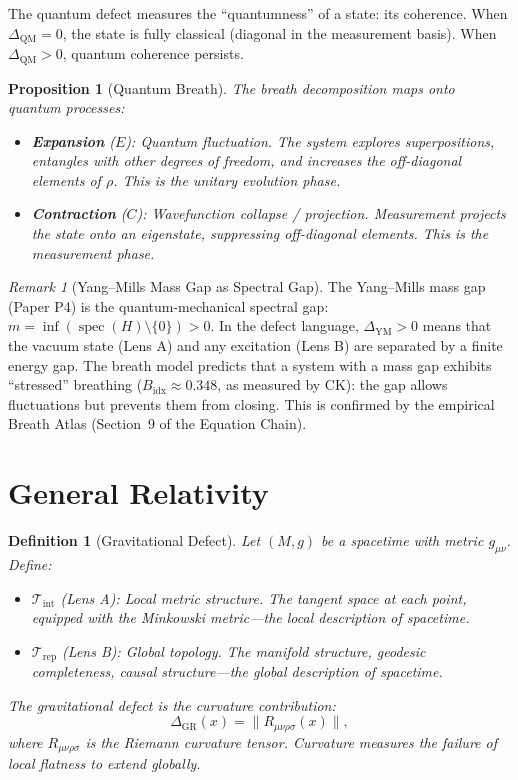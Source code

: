 \documentclass[12pt, openany]{book}
\newtheorem{proposition}[theorem]{Proposition}
\newtheorem{definition}[theorem]{Definition}
\theoremstyle{remark}
\newtheorem{remark}[theorem]{Remark}
\newcommand{\Tint}{\mathcal{T}_{\mathrm{int}}}
\newcommand{\Trep}{\mathcal{T}_{\mathrm{rep}}}
\DeclareMathOperator{\spec}{spec}
\begin{document}
\noindent
The quantum defect measures the ``quantumness'' of a state: its coherence.
When $\Delta_{\mathrm{QM}} = 0$, the state is fully classical (diagonal in the
measurement basis).  When $\Delta_{\mathrm{QM}} > 0$, quantum coherence persists.

\begin{proposition}[Quantum Breath]
\label{prop:quantum-breath}
The breath decomposition maps onto quantum processes:
\begin{itemize}
  \item \textbf{Expansion} ($E$): Quantum fluctuation.  The system explores
        superpositions, entangles with other degrees of freedom, and increases
        the off-diagonal elements of $\rho$.  This is the unitary evolution
        phase.
  \item \textbf{Contraction} ($C$): Wavefunction collapse / projection.
        Measurement projects the state onto an eigenstate, suppressing
        off-diagonal elements.  This is the measurement phase.
\end{itemize}
\end{proposition}

\begin{remark}[Yang--Mills Mass Gap as Spectral Gap]
The Yang--Mills mass gap (Paper P4) is the quantum-mechanical spectral gap:
$m = \inf(\spec(H) \setminus \{0\}) > 0$.  In the defect language,
$\Delta_{\mathrm{YM}} > 0$ means that the vacuum state (Lens A) and any
excitation (Lens B) are separated by a finite energy gap.  The
breath model predicts that a system with a mass gap exhibits ``stressed''
breathing ($B_{\mathrm{idx}} \approx 0.348$, as measured by CK): the
gap allows fluctuations but prevents them from closing.  This is
confirmed by the empirical Breath Atlas (Section~9 of the Equation Chain).
\end{remark}


\section{General Relativity}
\label{sec:gr}

\begin{definition}[Gravitational Defect]
\label{def:gr-defect}
Let $(M, g)$ be a spacetime with metric $g_{\mu\nu}$.  Define:
\begin{itemize}
  \item $\Tint$ (Lens A): Local metric structure.  The tangent space at each
        point, equipped with the Minkowski metric---the local description
        of spacetime.
  \item $\Trep$ (Lens B): Global topology.  The manifold structure, geodesic
        completeness, causal structure---the global description of spacetime.
\end{itemize}
The gravitational defect is the curvature contribution:
\[
  \Delta_{\mathrm{GR}}(x) = \|R_{\mu\nu\rho\sigma}(x)\|,
\]
where $R_{\mu\nu\rho\sigma}$ is the Riemann curvature tensor.  Curvature
measures the failure of local flatness to extend globally.
\end{definition}
\end{document}
